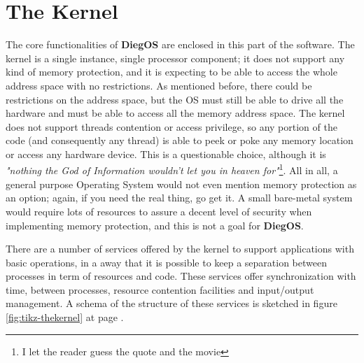 \documentclass[11pt,b5paper]{scrbook}
\newcommand{\myOS}{{\color{SteelBlue}\textbf{DiegOS}}}
\begin{document}
\section{The Kernel}
The core functionalities of {\myOS} are enclosed in this part of the software.
The kernel is a single instance, single processor component; it does not
support any kind of memory protection, and it is expecting to be able to access the
whole address space with no restrictions. As mentioned before, there could be restrictions
on the address space, but the OS must still be able to drive all the hardware and must
be able to access all the memory address space.
The kernel does not support threads contention or access privilege, so any portion of
the code (and consequently any thread) is able to peek or poke any memory location or 
access any hardware device.
This is a questionable choice, although it is \textit{"nothing the God of Information wouldn't let you in 
heaven for"}\footnote{I let the reader guess the quote and the movie}.
All in all, a general purpose Operating System would not even mention memory protection as an option; 
again, if you need the real thing, go get it. A small bare-metal system would require lots
of resources to assure a decent level of security when implementing memory protection,
and this is not a goal for {\myOS}.

There are a number of services offered by the kernel to support applications with basic operations,
in a away that it is possible to keep a separation between processes in term of resources and code.
These services offer synchronization with time, between processes, resource contention facilities and
input/output management.
A schema of the structure of these services is sketched in figure \ref{fig:tikz-thekernel} at page \pageref{fig:tikz-thekernel}. 
\end{document}
